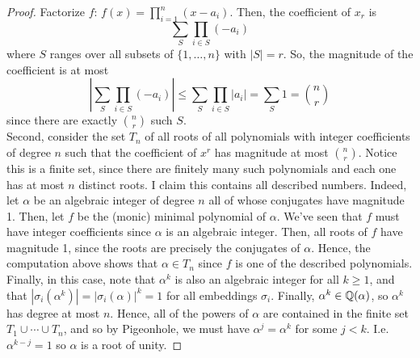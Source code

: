 \begin{proof}
    Factorize $f$: $f(x) = \prod_{i=1}^n (x-a_i)$. Then, the coefficient of $x_r$ is
    \[ \sum_S \prod_{i \in S} (-a_i) \]
    where $S$ ranges over all subsets of $\{1,\ldots,n\}$ with $|S| = r$. So, the magnitude of the coefficient is at most
    \[ \left|\sum_S \prod_{i \in S} (-a_i)\right| \leq \sum_S \prod_{i \in S} |a_i| = \sum_S 1 = {n \choose r} \]
    since there are exactly ${n \choose r}$ such $S$. \\

    Second, consider the set $T_n$ of all roots of all polynomials with integer coefficients of degree $n$ such that the coefficient of $x^r$ has magnitude at most ${n \choose r}$. Notice this is a finite set, since there are finitely many such polynomials and each one has at most $n$ distinct roots. I claim this contains all described numbers. Indeed, let $\alpha$ be an algebraic integer of degree $n$ all of whose conjugates have magnitude 1. Then, let $f$ be the (monic) minimal polynomial of $\alpha$. We've seen that $f$ must have integer coefficients since $\alpha$ is an algebraic integer. Then, all roots of $f$ have magnitude 1, since the roots are precisely the conjugates of $\alpha$. Hence, the computation above shows that $\alpha \in T_n$ since $f$ is one of the described polynomials. \\

    Finally, in this case, note that $\alpha^k$ is also an algebraic integer for all $k \geq 1$, and that $|\sigma_i(\alpha^k)| = |\sigma_i(\alpha)|^k = 1$ for all embeddings $\sigma_i$. Finally, $\alpha^k \in \mathbb{Q}(\alpha)$, so $\alpha^k$ has degree at most $n$. Hence, all of the powers of $\alpha$ are contained in the finite set $T_1 \cup \cdots \cup T_n$, and so by Pigeonhole, we must have $\alpha^j = \alpha^k$ for some $j < k$. I.e. $\alpha^{k-j} = 1$ so $\alpha$ is a root of unity.
\end{proof}
